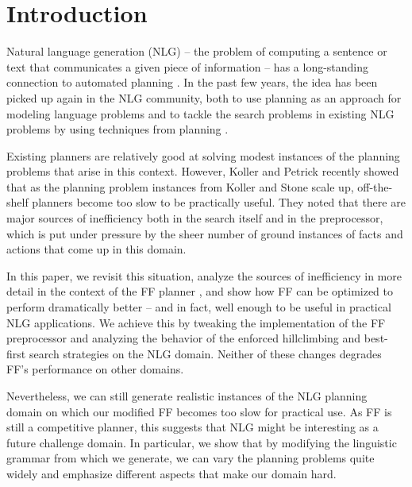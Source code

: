 \section{Introduction} \label{sec:introduction}

Natural language generation (NLG) -- the problem of computing a
sentence or text that communicates a given piece of information -- has
a long-standing connection to automated planning
\cite{perrault80,appelt:planning}. In the past few years, the idea has
been picked up again in the NLG community, both to use planning as an
approach for modeling language problems
\cite{Steedman-Petrick:07,benotti08b} and to tackle the search
problems in existing NLG problems by using techniques from planning
\cite{KolSto07}.

Existing planners are relatively good at solving modest instances of
the planning problems that arise in this context. However, Koller and
Petrick 
recently showed that as the planning problem instances from Koller and
Stone  scale up, off-the-shelf planners become too
slow to be practically useful. They noted that there are major sources
of inefficiency both in the search itself and in the preprocessor,
which is put under pressure by the sheer number of ground instances of
facts and actions that come up in this domain.

In this paper, we revisit this situation, analyze the sources of
inefficiency in more detail in the context of the FF planner
\cite{HoffmannNebel01}, and show how FF can be optimized to perform
dramatically better -- and in fact, well enough to be useful in
practical NLG applications.  We achieve this by tweaking the
implementation of the FF preprocessor and analyzing the behavior of
the enforced hillclimbing and best-first search strategies on the NLG
domain.  Neither of these changes degrades FF's performance on other
domains.

Nevertheless, we can still generate realistic instances of the NLG
planning domain on which our modified FF becomes too slow for
practical use.  As FF is still a competitive planner, this suggests
that NLG might be interesting as a future challenge domain.  In
particular, we show that by modifying the linguistic grammar from
which we generate, we can vary the planning problems quite widely and
emphasize different aspects that make our domain hard.




